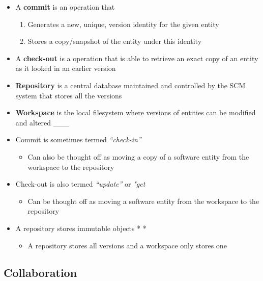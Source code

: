 \documentclass[11pt]{article}
\providecommand{\tightlist}{%
      \setlength{\itemsep}{0pt}\setlength{\parskip}{0pt}}
\begin{document}
\begin{itemize}
\tightlist
\item
  A \textbf{commit} is an operation that

  \begin{enumerate}
  \def\labelenumi{\arabic{enumi}.}
  \tightlist
  \item
    Generates a new, unique, version identity for the given entity
  \item
    Stores a copy/snapshot of the entity under this identity
  \end{enumerate}
\item
  A \textbf{check-out} is a operation that is able to retrieve an exact
  copy of an entity as it looked in an earlier version
\item
  \textbf{Repository} is a central database maintained and controlled by
  the SCM system that stores all the versions
\item
  \textbf{Workspace} is the local filesystem where versions of entities
  can be modified and altered \_\_\_
\item
  Commit is sometimes termed \emph{``check-in''}

  \begin{itemize}
  \tightlist
  \item
    Can also be thought off as moving a copy of a software entity from
    the workspace to the repository
  \end{itemize}
\item
  Check-out is also termed \emph{``update''} or \emph{"get}

  \begin{itemize}
  \tightlist
  \item
    Can be thought off as moving a software entity from the workspace to
    the repository
  \end{itemize}
\item
  A repository stores immutable objects * *

  \begin{itemize}
  \tightlist
  \item
    A repository stores all versions and a workspace only stores one
  \end{itemize}
\end{itemize}

\hypertarget{collaboration}{%
\subsection{Collaboration}\label{collaboration}}
\end{document}
